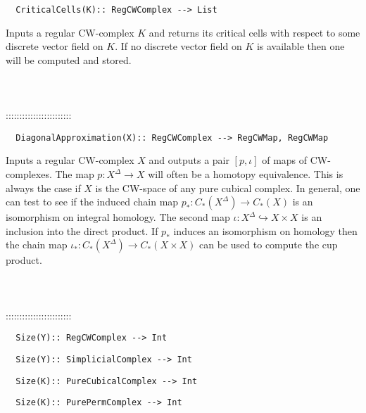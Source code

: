 \documentclass[a4paper,11pt]{report}
\begin{document}
{\begin{verbatim}  CriticalCells(K):: RegCWComplex --> List
\end{verbatim}


 

 Inputs a regular CW-complex $K$ and returns its critical cells with respect to some discrete vector field on $K$. If no discrete vector field on $K$ is available then one will be computed and stored. \\
 \\
 \\
 \\
 ::::::::::::::::::::::::\\
 
\begin{verbatim}  DiagonalApproximation(X):: RegCWComplex --> RegCWMap, RegCWMap
\end{verbatim}


 

 Inputs a regular CW-complex $X$ and outputs a pair $[p,\iota]$ of maps of CW-complexes. The map $p\colon X^\Delta \rightarrow X$ will often be a homotopy equivalence. This is always the case if $X$ is the CW-space of any pure cubical complex. In general, one can test to see
if the induced chain map $p_\ast \colon C_\ast(X^\Delta) \rightarrow C_\ast(X)$ is an isomorphism on integral homology. The second map $\iota \colon X^\Delta \hookrightarrow X\times X$ is an inclusion into the direct product. If $p_\ast$ induces an isomorphism on homology then the chain map $\iota_\ast\colon C_\ast(X^\Delta) \rightarrow C_\ast(X\times X)$ can be used to compute the cup product. \\
 \\
 \\
 \\
 ::::::::::::::::::::::::\\
 
\begin{verbatim}  Size(Y):: RegCWComplex --> Int
\end{verbatim}
 
\begin{verbatim}  Size(Y):: SimplicialComplex --> Int
\end{verbatim}
 
\begin{verbatim}  Size(K):: PureCubicalComplex --> Int
\end{verbatim}
 
\begin{verbatim}  Size(K):: PurePermComplex --> Int
\end{verbatim}


}
\end{document}
